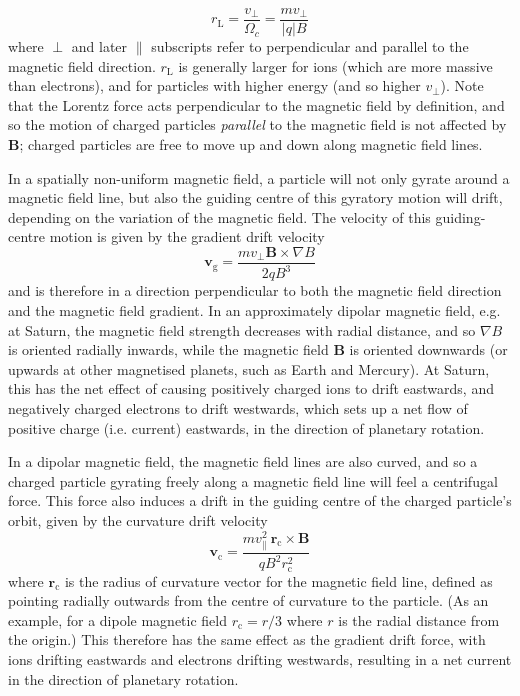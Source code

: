 \begin{equation}
r_\mathrm{L} = \frac{v_\perp}{\Omega_c} = \frac{mv_\perp}{|q|B}
\end{equation}
where $\perp$ and later $\parallel$ subscripts refer to perpendicular and parallel to the magnetic field direction. $r_\mathrm{L}$ is generally larger for ions (which are more massive than electrons), and for particles with higher energy (and so higher $v_\perp$). Note that the Lorentz force acts perpendicular to the magnetic field by definition, and so the motion of charged particles \textit{parallel} to the magnetic field is not affected by $\boldsymbol{B}$; charged particles are free to move up and down along magnetic field lines.

In a spatially non-uniform magnetic field, a particle will not only gyrate around a magnetic field line, but also the guiding centre of this gyratory motion will drift, depending on the variation of the magnetic field. The velocity of this guiding-centre motion is given by the gradient drift velocity
\begin{equation}
\boldsymbol{v}_\mathrm{g} = \frac{mv_\perp\boldsymbol{B}\times\nabla B}{2qB^3}
\end{equation}
and is therefore in a direction perpendicular to both the magnetic field direction and the magnetic field gradient. In an approximately dipolar magnetic field, e.g. at Saturn, the magnetic field strength decreases with radial distance, and so $\nabla B$ is oriented radially inwards, while the magnetic field $\boldsymbol{B}$ is oriented downwards (or upwards at other magnetised planets, such as Earth and Mercury). At Saturn, this has the net effect of causing positively charged ions to drift eastwards, and negatively charged electrons to drift westwards, which sets up a net flow of positive charge (i.e. current) eastwards, in the direction of planetary rotation.

In a dipolar magnetic field, the magnetic field lines are also curved, and so a charged particle gyrating freely along a magnetic field line will feel a centrifugal force. This force also induces a drift in the guiding centre of the charged particle's orbit, given by the curvature drift velocity
\begin{equation}
\boldsymbol{v}_\mathrm{c} = \frac{mv_\parallel^2~\boldsymbol{r}_\mathrm{c}\times\boldsymbol{B}}{qB^2r_\mathrm{c}^2}
\end{equation}
where $\boldsymbol{r}_\mathrm{c}$ is the radius of curvature vector for the magnetic field line, defined as pointing radially outwards from the centre of curvature to the particle. (As an example, for a dipole magnetic field $r_\mathrm{c}= r/3$ where $r$ is the radial distance from the origin.) This therefore has the same effect as the gradient drift force, with ions drifting eastwards and electrons drifting westwards, resulting in a net current in the direction of planetary rotation. 

